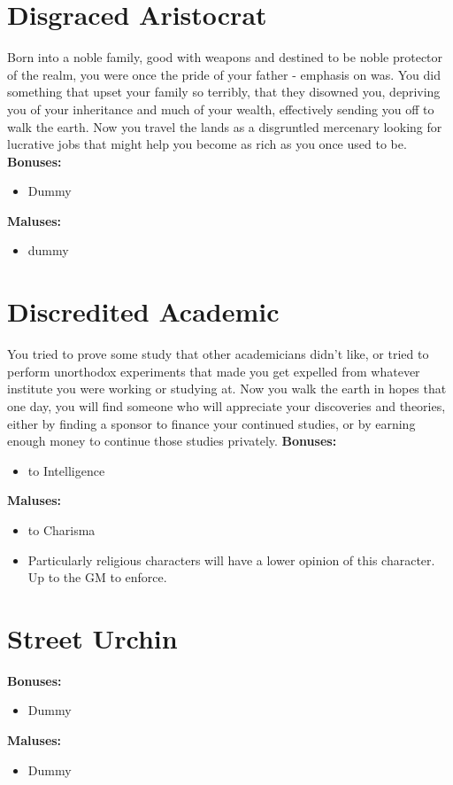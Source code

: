 \documentclass[openany,10pt,a4paper]{book}
\begin{document}
\section{Disgraced Aristocrat}
Born into a noble family, good with weapons and destined to be noble protector of the realm, you were once the pride of your father - emphasis on was. You did something that upset your family so terribly, that they disowned you, depriving you of your inheritance and much of your wealth, effectively sending you off to walk the earth. Now you travel the lands as a disgruntled mercenary looking for lucrative jobs that might help you become as rich as you once used to be.\newline
\textbf{Bonuses:}
\begin{itemize}
	\item Dummy
\end{itemize}
\textbf{Maluses:}
\begin{itemize}
	\item dummy
\end{itemize}
\section{Discredited Academic}
You tried to prove some study that other academicians didn't like, or tried to perform unorthodox experiments that made you get expelled from whatever institute you were working or studying at. Now you walk the earth in hopes that one day, you will find someone who will appreciate your discoveries and theories, either by finding a sponsor to finance your continued studies, or by earning enough money to continue those studies privately.\newline
\textbf{Bonuses:}
\begin{itemize}
	\item {} to Intelligence
\end{itemize}
\textbf{Maluses:}
\begin{itemize}
	\item {} to Charisma
	\item Particularly religious characters will have a lower opinion of this character. Up to the GM to enforce.
\end{itemize}
\section{Street Urchin}
\textbf{Bonuses:}
\begin{itemize}
	\item Dummy
\end{itemize}
\textbf{Maluses:}
\begin{itemize}
	\item Dummy
\end{itemize}
\end{document}
